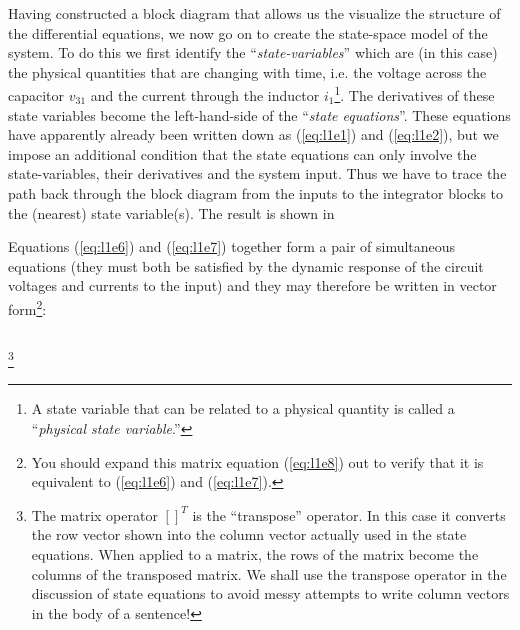Having constructed a block diagram that allows us the visualize
the structure of the differential equations, we now go on to
create the state-space model of the system. To do this we first
identify the ``\emph{state-variables}'' which are (in this case)
the physical quantities that are changing with time, i.e. the
voltage across the capacitor $v_{31}$ and the current through the
inductor $i_1$\footnote{A state variable that can be related to a
physical quantity is called a ``\emph{physical state
variable}.''}. The derivatives of these state variables become the
left-hand-side of the ``\emph{state equations}''. These equations
have apparently already been written down as (\ref{eq:l1e1}) and
(\ref{eq:l1e2}), but we impose an additional condition that the
state equations can only involve the state-variables, their
derivatives and the system input. Thus we have to trace the path
back through the block diagram from the inputs to the integrator
blocks to the (nearest) state variable(s). The result is
\ifslidesonly
shown in 
\begin{slide}\label{slide:ss1}

\end{slide}
\fi

Equations (\ref{eq:l1e6}) and (\ref{eq:l1e7}) together form a pair
of simultaneous equations (they must both be satisfied by the
dynamic response of the circuit voltages and currents to the
input) and they may therefore be written in vector
form\footnote{You should expand this matrix equation
(\ref{eq:l1e8}) out to verify that it is equivalent to
(\ref{eq:l1e6}) and (\ref{eq:l1e7}).}:
\begin{equation}\label{eq:l1e8}

\end{equation}
\ifslidesonly
\begin{slide}
\begin{displaymath}

\end{displaymath}

\end{slide}
\fi
\footnote{The matrix
operator $[]^T$ is the ``transpose'' operator. In this case it
converts the row vector shown into the column vector actually used
in the state equations. When applied to a matrix, the rows of the
matrix become the columns of the transposed matrix. We shall use
the transpose operator in the discussion of state equations to
avoid messy attempts to write column vectors in the body of a
sentence!}

